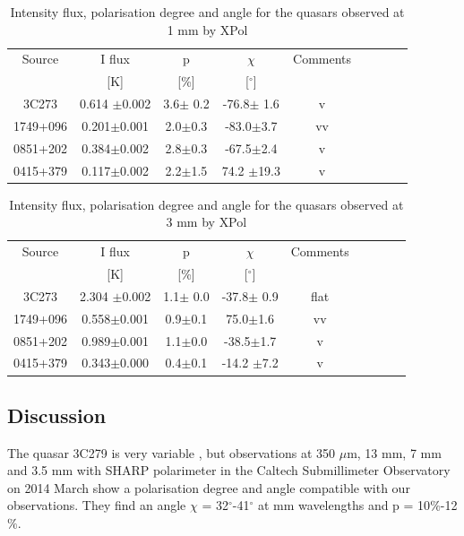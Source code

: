 \documentclass[a4paper,10pt]{article}
\begin{document}
\begin{table}[h!]
\caption{Intensity flux, polarisation degree and angle for the quasars observed at 1 mm by XPol}
\begin{center}
\begin{tabular}{ccccccccc}
\hline
\hline
Source & I flux & p & $\chi$ & Comments\\
 & [K] & [\%] & [$^\circ$]\\
\hline
3C273 & 0.614 $\pm$0.002 & 3.6$\pm$ 0.2 & -76.8$\pm$ 1.6 & v\\
1749+096 & 0.201$\pm$0.001 & 2.0$\pm$0.3 & -83.0$\pm$3.7 & vv\\
0851+202 & 0.384$\pm$0.002 & 2.8$\pm$0.3 & -67.5$\pm$2.4 & v\\
0415+379 & 0.117$\pm$0.002 & 2.2$\pm$1.5 & 74.2 $\pm$19.3 & v\\
\hline
\end{tabular}
\end{center}
\label{tab:xpol_1mm}
\end{table}

\begin{table}[h!]
\caption{Intensity flux, polarisation degree and angle for the quasars observed at 3 mm by XPol}
\begin{center}
\begin{tabular}{ccccccccc}
\hline
\hline
Source & I flux & p & $\chi$ & Comments\\
 & [K] & [\%] & [$^\circ$]\\
\hline
3C273 & 2.304 $\pm$0.002 & 1.1$\pm$ 0.0 & -37.8$\pm$ 0.9 & flat\\
1749+096 & 0.558$\pm$0.001 & 0.9$\pm$0.1 & 75.0$\pm$1.6 & vv\\
0851+202 & 0.989$\pm$0.001 & 1.1$\pm$0.0 & -38.5$\pm$1.7 & v\\
0415+379 & 0.343$\pm$0.000 & 0.4$\pm$0.1 & -14.2 $\pm$7.2 & v\\
\hline
\end{tabular}
\end{center}
\label{tab:xpol_3mm}
\end{table}


\subsection{Discussion}
The quasar 3C279 is very variable \cite{lee}, but observations at 350 $\mu$m, 13 mm, 7 mm and 3.5 mm with SHARP polarimeter in the Caltech Submillimeter Observatory on 2014 March show a polarisation degree and angle compatible with our observations. They find an angle $\chi$ = 32$^\circ$-41$^\circ$ at mm wavelengths and p = 10$\%$-12$\%$.
\end{document}
